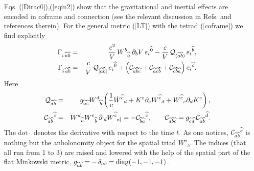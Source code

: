 \documentclass[preprint,showpacs,preprintnumbers,eqsecnum,amsmath,amssymb]{revtex4}
\begin{document}
Eqs. (\ref{Dirac0}),(\ref{eqin2}) show that the gravitational and
inertial effects are encoded in coframe and connection (see the
relevant discussion in Refs. \cite{Ob1,Ob2} and references
therein). For the general metric (\ref{LT}) with the tetrad
(\ref{coframe}) we find explicitly
\begin{eqnarray}
\Gamma_{i\,\widehat{a}\widehat{0}} &=& {\frac
{c^2}V}\,W^b{}_{\widehat{a}} \,\partial_bV\,e_i{}^{\widehat{0}} -
{\frac cV}\,{\cal Q}_{(\widehat{a}\widehat{b})}
\,e_i{}^{\widehat{b}},\label{connection1}\\
\Gamma_{i\,\widehat{a}\widehat{b}} &=& {\frac cV}\,{\cal
Q}_{[\widehat{a} \widehat{b}]}\,e_i{}^{\widehat{0}} + \left({\cal
C}_{\widehat{a}\widehat{b} \widehat{c}} + {\cal
C}_{\widehat{a}\widehat{c}\widehat{b}} + {\cal
C}_{\widehat{c}\widehat{b}\widehat{a}}\right)
e_i{}^{\widehat{c}}.\label{connection2}
\end{eqnarray}
Here 
\begin{eqnarray}
{\cal Q}_{\widehat{a}\widehat{b}} &=&
g_{\widehat{a}\widehat{c}}W^d{}_{\widehat{b}} \left({\frac
1c}\dot{W}^{\widehat c}{}_d + K^e\partial_e{W}^{\widehat c}{}_d +
{W}^{\widehat c}{}_e\partial_dK^e\right),\label{Qab}\\
{\cal C}_{\widehat{a}\widehat{b}}{}^{\widehat{c}} &=&
W^d{}_{\widehat{a}}
W^e{}_{\widehat{b}}\,\partial_{[d}W^{\widehat{c}}{}_{e]}=- {\cal
C}_{\widehat{b}\widehat{a}}{}^{\widehat{c}},\qquad {\cal
C}_{\widehat{a} \widehat{b}\widehat{c}} =
g_{\widehat{c}\widehat{d}}\,{\cal C}_{\widehat{a}
\widehat{b}}{}^{\widehat{d}}.\label{Cabc}
\end{eqnarray}
The dot $\dot{\,}$ denotes the derivative with respect to the time
$t$. As one notices, ${\cal
C}_{\widehat{a}\widehat{b}}{}^{\widehat{c}}$ is nothing but the
anholonomity object for the spatial triad ${W}^{\widehat a}{}_b$.
The indices (that all run from 1 to 3) are raised and lowered with
the help of the spatial part of the flat Minkowski metric,
$g_{\widehat{a}\widehat{b}} = -\,\delta_{ab} = {\rm diag}(-1, -1, -1)$.
\end{document}
